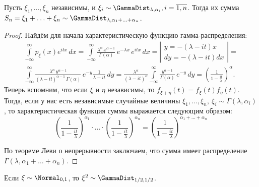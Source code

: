 \begin{lem}
    Пусть $\xi_{1}, \ldots, \xi_{n}$ независимы, и $\xi_i \sim \GammaDist_{\lambda, \alpha_i}, i=\overline{1,n}$. 
    Тогда их сумма $S_{n}=\xi_{1}+\ldots+\xi_{n} \sim \GammaDist_{\lambda, \alpha_1 + \ldots + \alpha_n}$.
\end{lem}
\begin{proof}
    Найдём для начала характеристическую функцию гамма-распределения:
    \begin{multline*}
        \int\limits_{-\infty}^{\infty} p_{\xi}(x) e^{itx} \, dx = 
        \int\limits_{-\infty}^{\infty} \frac{\lambda^\alpha \, x^{\alpha - 1}}{\Gamma(\alpha)} \, e^{-\lambda x}\, e^{itx} \,dx = 
        \left| \begin{array}{c}
            y  = -(\lambda - it)x \\
            dy = -(\lambda - it)dx
        \end{array} \right| = \\
        \int\limits_{-\infty}^{\infty} \frac{\lambda^\alpha \, y^{\alpha - 1}}{(\lambda - it)^{\alpha - 1} \, \Gamma(\alpha)} \, e^{-y} \frac{1}{\lambda - it} \,dy = 
        \frac{\lambda^\alpha}{(\lambda - it)^{\alpha}} \int\limits_{-\infty}^{\infty} \frac{y^{\alpha - 1}}{\Gamma(\alpha)} \, e^{-y} \, dy = 
        \left(\frac{1}{1 - \frac{it}{\lambda}} \right)^\alpha \!.
    \end{multline*}
    Теперь вспомним, что если $\xi$ и $\eta$ независимы, то $f_{\xi + \eta}(t) = f_{\xi}(t) f_{\eta}(t)$.
    Тогда, если у нас есть независимые случайные величины $\xi_1, \ldots, \xi_n, \: \xi_i \sim \Gamma(\lambda, \alpha_i)$, 
    то характеристическая функция суммы выражается следующим образом:
    \begin{equation*}
        \left(\frac{1}{1 - \frac{it}{\lambda}} \right)^{\alpha_1} \cdot \ldots \cdot \left(\frac{1}{1 - \frac{it}{\lambda}} \right)^{\alpha_n} = 
        \left(\frac{1}{1 - \frac{it}{\lambda}} \right)^{\alpha_1 + \ldots + \alpha_n}
    \end{equation*}

    По теореме Леви о непрерывности заключаем, что сумма имеет распределение $\Gamma(\lambda, \alpha_1 + \ldots + \alpha_n)$.
\end{proof}

\begin{lem}
    Если $\xi \sim \Normal_{0,1}$, то $\xi^2 \sim \GammaDist_{1/2, 1/2}$.
\end{lem}

